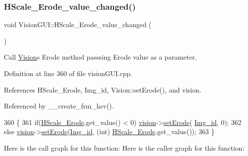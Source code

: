 \subsubsection{\texorpdfstring{H\+Scale\+\_\+\+Erode\+\_\+value\+\_\+changed()}{HScale\_Erode\_value\_changed()}}
{\footnotesize\ttfamily void Vision\+G\+U\+I\+::\+H\+Scale\+\_\+\+Erode\+\_\+value\+\_\+changed (\begin{DoxyParamCaption}{ }\end{DoxyParamCaption})\hspace{0.3cm}{\ttfamily [private]}}



Call \hyperlink{class_vision}{Vision}\textquotesingle{}s Erode method passsing Erode value as a parameter. 



Definition at line 360 of file vision\+G\+U\+I.\+cpp.



References H\+Scale\+\_\+\+Erode, Img\+\_\+id, Vision\+::set\+Erode(), and vision.



Referenced by \+\_\+\+\_\+create\+\_\+frm\+\_\+hsv().


\begin{DoxyCode}
360                                            \{
361     \textcolor{keywordflow}{if}(\hyperlink{class_vision_g_u_i_ad4bc77416f4e50fa03a7cc7f64a2d78e}{HScale\_Erode}.get\_value() < 0) \hyperlink{class_vision_g_u_i_a36aba058af844ec6cbe0c945c616cd5f}{vision}->\hyperlink{class_vision_a1313404c61d1518f8b8cb354377ed5f1}{setErode}(
      \hyperlink{class_vision_g_u_i_a4a46f114bc58e0f1d56b655f4bc8f9d8}{Img\_id}, 0);
362     \textcolor{keywordflow}{else} \hyperlink{class_vision_g_u_i_a36aba058af844ec6cbe0c945c616cd5f}{vision}->\hyperlink{class_vision_a1313404c61d1518f8b8cb354377ed5f1}{setErode}(\hyperlink{class_vision_g_u_i_a4a46f114bc58e0f1d56b655f4bc8f9d8}{Img\_id}, (\textcolor{keywordtype}{int}) \hyperlink{class_vision_g_u_i_ad4bc77416f4e50fa03a7cc7f64a2d78e}{HScale\_Erode}.get\_value());
363 \}
\end{DoxyCode}
Here is the call graph for this function\+:
Here is the caller graph for this function\+:
\mbox{\label{class_vision_g_u_i_ad12a91dfc3c8cd3ef213d4d518d85267}} 
